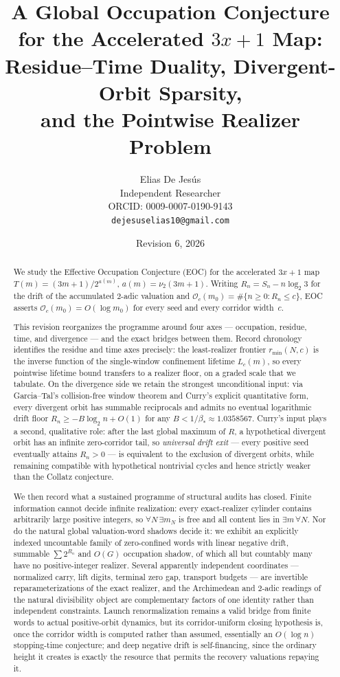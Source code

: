 \documentclass[11pt]{article}
\title{A Global Occupation Conjecture for the Accelerated $3x+1$ Map:\\
Residue--Time Duality, Divergent-Orbit Sparsity,\\ and the Pointwise Realizer Problem}
\author{Elias De Jes\'us\\ Independent Researcher\\ ORCID: 0009-0007-0190-9143\\ \texttt{dejesuselias10@gmail.com}}
\date{Revision 6, 2026}
\theoremstyle{plain}
\theoremstyle{definition}
\theoremstyle{remark}
\newcommand{\Occ}{\mathcal{O}}
\newcommand{\rmin}{r_{\min}}
\begin{document}
\maketitle

\begin{abstract}
We study the Effective Occupation Conjecture (EOC) for the accelerated $3x+1$ map
$T(m)=(3m+1)/2^{a(m)}$, $a(m)=\nu_2(3m+1)$. Writing $R_n=S_n-n\log_2 3$ for the drift of the
accumulated $2$-adic valuation and $\Occ_c(m_0)=\#\{n\ge 0: R_n\le c\}$, EOC asserts
$\Occ_c(m_0)=O(\log m_0)$ for every seed and every corridor width~$c$.

This revision reorganizes the programme around four axes --- occupation, residue, time, and
divergence --- and the exact bridges between them. Record chronology identifies the residue and
time axes precisely: the least-realizer frontier $\rmin(N,c)$ is the inverse function of the
single-window confinement lifetime $L_c(m)$, so every pointwise lifetime bound transfers to a
realizer floor, on a graded scale that we tabulate. On the divergence side we retain the strongest
unconditional input: via Garcia--Tal's collision-free window theorem and Curry's explicit
quantitative form, every divergent orbit has summable reciprocals and admits no eventual
logarithmic drift floor $R_n\ge -B\log_2 n+O(1)$ for any $B<1/\beta_*\approx 1.0358567$. Curry's
input plays a second, qualitative role: after the last global maximum of $R$, a hypothetical
divergent orbit has an infinite zero-corridor tail, so \emph{universal drift exit} --- every
positive seed eventually attains $R_n>0$ --- is equivalent to the exclusion of divergent orbits,
while remaining compatible with hypothetical nontrivial cycles and hence strictly weaker than the
Collatz conjecture.

We then record what a sustained programme of structural audits has closed. Finite information
cannot decide infinite realization: every exact-realizer cylinder contains arbitrarily large
positive integers, so $\forall N\,\exists m_N$ is free and all content lies in $\exists m\,\forall N$.
Nor do the natural global valuation-word shadows decide it: we exhibit an explicitly indexed
uncountable family of zero-confined words with linear negative drift, summable $\sum 2^{R_n}$ and
$O(G)$ occupation shadow, of which all but countably many have no positive-integer realizer.
Several apparently independent coordinates --- normalized carry, lift digits, terminal zero gap,
transport budgets --- are invertible reparameterizations of the exact realizer, and the Archimedean
and $2$-adic readings of the natural divisibility object are complementary factors of one identity
rather than independent constraints. Launch renormalization remains a valid bridge from finite
words to actual positive-orbit dynamics, but its corridor-uniform closing hypothesis is, once the
corridor width is computed rather than assumed, essentially an $O(\log n)$ stopping-time
conjecture; and deep negative drift is self-financing, since the ordinary height it creates is
exactly the resource that permits the recovery valuations repaying it.


\end{abstract}
\end{document}
